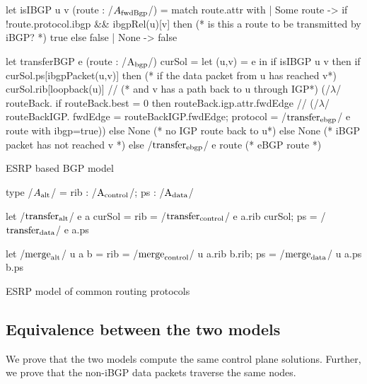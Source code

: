 \documentclass[sigconf,10pt]{acmart}
\begin{document}
\begin{listing}[ht]
\begin{ocamlcode}
  let isIBGP u v (route : /$A_{\fbgp}$/) =
    match route.attr with
    | Some route ->
      if !route.protocol.ibgp && ibgpRel(u)[v] then (* is this a route to be transmitted by iBGP? *)
        true
      else
        false
    | None -> false
        
  let transferBGP e (route : /$\A_{\bgp}$/) curSol =
  let (u,v) = e  in
  if isIBGP u v then
    if curSol.ps[ibgpPacket(u,v)] then (* if the data packet from u has reached v*)
      curSol.rib[loopback(u)] /\bind/ (* and v has a path back to u through IGP*)
        (/$\lambda$/ routeBack. 
          if routeBack.best = 0 then
            routeBack.igp.attr.fwdEdge /\bind/
              (/$\lambda$/ routeBackIGP.
                { fwdEdge = routeBackIGP.fwdEdge;
                  protocol = /$\transfer_{\ebgp}$/ e {route with ibgp=true}}))
          else None (* no IGP route back to u*)
    else
       None (* iBGP packet has not reached v *)
  else
    /$\transfer_{\ebgp}$/ e route (* eBGP route *)
  \end{ocamlcode}
  \caption{ESRP based BGP model}
  \label{lst:ibgp-alternative-model}
\end{listing}

\begin{listing}[ht]
  \begin{ocamlcode}
    type /$A_{\alt}$/ = { rib : /$\A_{\control}$/; ps : /$\A_{\data}$/ }
   
    let /$\transfer_{\alt}$/ e a curSol =
      { rib = /$\transfer_{\control}$/ e a.rib curSol;
        ps = /$\transfer_{\data}$/ e a.ps
      }
            
    let /$\merge_{\alt}$/ u a b =
      {rib = /$\merge_{\control}$/ u a.rib b.rib; ps = /$\merge_{\data}$/ u a.ps b.ps}
\end{ocamlcode}
\caption{ESRP model of common routing protocols}
\label{lst:esrp-model}
\end{listing}

\subsection{Equivalence between the two models}

We prove that the two models compute the same control plane solutions.
Further, we prove that the non-iBGP data packets traverse the same
nodes.
\end{document}
